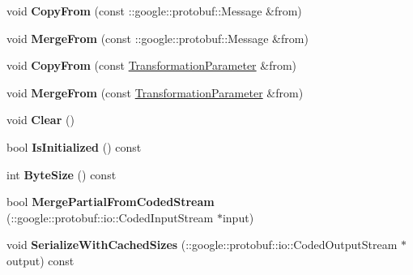 \begin{DoxyCompactItemize}
void {\bfseries Copy\+From} (const \+::google\+::protobuf\+::\+Message \&from)
\item 
\mbox{\label{classcaffe_1_1_transformation_parameter_a1df9b8c0d4126e2631374a28b6276cca}} 
void {\bfseries Merge\+From} (const \+::google\+::protobuf\+::\+Message \&from)
\item 
\mbox{\label{classcaffe_1_1_transformation_parameter_a6e97cc202c8bfdee9e8a92b1bbd61173}} 
void {\bfseries Copy\+From} (const \mbox{\hyperlink{classcaffe_1_1_transformation_parameter}{Transformation\+Parameter}} \&from)
\item 
\mbox{\label{classcaffe_1_1_transformation_parameter_a837d5c5c92c195aa529d2e5716e4fe1f}} 
void {\bfseries Merge\+From} (const \mbox{\hyperlink{classcaffe_1_1_transformation_parameter}{Transformation\+Parameter}} \&from)
\item 
\mbox{\label{classcaffe_1_1_transformation_parameter_a9dd3df2b481ab48a46de95de0b7fac79}} 
void {\bfseries Clear} ()
\item 
\mbox{\label{classcaffe_1_1_transformation_parameter_a916e6617d8e62f38ab4415231b768801}} 
bool {\bfseries Is\+Initialized} () const
\item 
\mbox{\label{classcaffe_1_1_transformation_parameter_a21623a4629bc4a7fee16b245418ff926}} 
int {\bfseries Byte\+Size} () const
\item 
\mbox{\label{classcaffe_1_1_transformation_parameter_a8f00fbcf697bd09182e0c0f0187892a4}} 
bool {\bfseries Merge\+Partial\+From\+Coded\+Stream} (\+::google\+::protobuf\+::io\+::\+Coded\+Input\+Stream $\ast$input)
\item 
\mbox{\label{classcaffe_1_1_transformation_parameter_a025c6f1a2394cd973ddb8aaa17a59bf9}} 
void {\bfseries Serialize\+With\+Cached\+Sizes} (\+::google\+::protobuf\+::io\+::\+Coded\+Output\+Stream $\ast$output) const
\item 

\end{DoxyCompactItemize}
